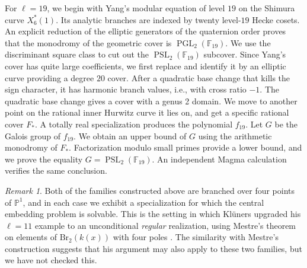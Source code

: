\documentclass[10pt]{amsart}
\numberwithin{equation}{section}
\theoremstyle{definition}
\theoremstyle{remark}
\newtheorem{remark}[theorem]{Remark}
\newcommand{\PP}{\mathbb P}
\newcommand{\F}{\mathbb{F}}
\newcommand{\PGL}{\operatorname{PGL}}
\newcommand{\PSL}{\operatorname{PSL}}
\begin{document}
For $\ell=19$, we begin with Yang's \cite{YangModularEquations}
modular equation of level $19$ on the Shimura curve $X_6^*(1)$.  Its analytic branches are indexed by twenty level-$19$ Hecke
cosets. An explicit reduction of the elliptic generators of the
quaternion order proves that the monodromy of the geometric cover is $\PGL_2(\F_{19})$. We use the discriminant square class to cut out the $\PSL_2(\F_{19})$ subcover. Since Yang's cover has quite large coefficients, we first replace and identify it by an elliptic curve providing a degree $20$ cover. After a quadratic base change that kills the sign character, it has harmonic branch values, i.e., with cross ratio $-1$. The quadratic base change gives a cover with a genus 2 domain. We move to another point on the rational inner Hurwitz curve it lies on, and get a specific rational cover $F_*$. A totally real specialization produces the polynomial $f_{19}$. Let $G$ be the Galois group of $f_{19}$. We obtain an upper bound of $G$ using the arithmetic monodromy of $F_*$. Factorization modulo small primes provide a lower bound, and we prove the equality $G=\PSL_2(\F_{19})$. An independent Magma calculation verifies the same conclusion.


\begin{remark}\label{rem:regular}
Both of the families constructed above are branched over four points of
$\PP^1$, and in each case we exhibit a specialization for which the central
embedding problem is solvable.  This is the setting in which Kl\"uners
upgraded his $\ell=11$ example to an unconditional \emph{regular}
realization, using Mestre's theorem on elements of $\mathrm{Br}_2(k(x))$ with four poles \cite{Mestre1994b}. The similarity with Mestre’s construction suggests that his argument may also apply to these two families, but we have not checked this.
\end{remark}
\end{document}
